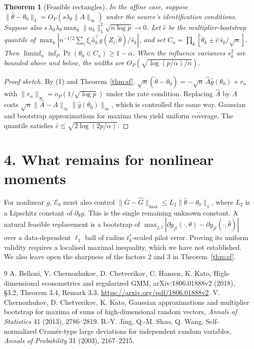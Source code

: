 \documentclass[11pt]{article}
\newtheorem{theorem}{Theorem}
\theoremstyle{definition}
\begin{document}
\begin{theorem}[Feasible rectangles]\label{thm:rect}
In the affine case, suppose $\|\widehat\theta-\theta_0\|_1=O_P(s\lambda_\theta\|A\|_\infty)$ under the source's
identification conditions. Suppose also $s\,\lambda_0\lambda_\theta\max_k\|a_k\|_1^2\sqrt{n\log p}\to0$. Let
$\widehat c$ be the multiplier-bootstrap quantile of $\max_k|n^{-1/2}\sum_i\xi_i\widehat a_k^\top g(Z_i,\check\theta)/\widehat s_k|$,
and set $C_n=\prod_k[\check\theta_k\pm\widehat c\,\widehat s_k/\sqrt n]$. Then
$\liminf_n\inf_P\Pr(\theta_0\in C_n)\ge1-\alpha$. When the influence variances $s_k^2$ are bounded above and below,
the widths are $O_P(\sqrt{\log(p/\alpha)/n})$.
\end{theorem}
\begin{proof}[Proof sketch]
By (1) and Theorem~\ref{thm:sf}, $\sqrt n(\check\theta-\theta_0)=-\sqrt n\,\widehat A\widehat g(\theta_0)+r_n$ with
$\|r_n\|_\infty=o_P(1/\sqrt{\log p})$ under the rate condition. Replacing $\widehat A$ by $A$ costs
$\sqrt n\|\widehat A-A\|_{\infty}\|\widehat g(\theta_0)\|_\infty$, which is controlled the same way. Gaussian and bootstrap
approximations for maxima \cite{cck} then yield uniform coverage. The quantile satisfies $\widehat c\lesssim\sqrt{2\log(2p/\alpha)}$.
\end{proof}

\section*{4. What remains for nonlinear moments}
For nonlinear $g$, $\mathcal E_0$ must also control $\|\bar G-\widehat G\|_{\max}\le L_2\|\widehat\theta-\theta_0\|_1$, where
$L_2$ is a Lipschitz constant of $\partial_\theta g$. This is the single remaining unknown constant. A natural feasible
replacement is a bootstrap of $\max_{j,l}|\partial g_{jl}(\cdot,\theta)-\partial g_{jl}(\cdot,\widehat\theta)|$ over a data-dependent
$\ell_1$ ball of radius $t_k^*$-scaled pilot error. Proving its uniform validity requires a localised maximal inequality,
which we have not established. We also leave open the sharpness of the factors 2 and 3 in Theorem~\ref{thm:sf}.

\begin{thebibliography}{9}
 A. Belloni, V. Chernozhukov, D. Chetverikov, C. Hansen, K. Kato, High-dimensional econometrics and
regularized GMM, arXiv:1806.01888v2 (2018), \S3.2, Theorem 3.4, Remark 3.3. \url{https://arxiv.org/pdf/1806.01888v2}.
 V. Chernozhukov, D. Chetverikov, K. Kato, Gaussian approximations and multiplier bootstrap for maxima of sums
of high-dimensional random vectors, \emph{Annals of Statistics} 41 (2013), 2786--2819.
 B.-Y. Jing, Q.-M. Shao, Q. Wang, Self-normalized Cram\'er-type large deviations for independent random
variables, \emph{Annals of Probability} 31 (2003), 2167--2215.
\end{thebibliography}
\end{document}
